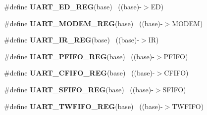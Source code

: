 \begin{DoxyCompactItemize}
\item 
\hypertarget{group___u_a_r_t___register___accessor___macros_ga57f93e1822a33516f473d1b62075115a}{}\#define {\bfseries U\+A\+R\+T\+\_\+\+E\+D\+\_\+\+R\+E\+G}(base)                                            ~((base)-\/$>$E\+D)\label{group___u_a_r_t___register___accessor___macros_ga57f93e1822a33516f473d1b62075115a}

\item 
\hypertarget{group___u_a_r_t___register___accessor___macros_ga7508e2348a7d075db40ace1902a407fa}{}\#define {\bfseries U\+A\+R\+T\+\_\+\+M\+O\+D\+E\+M\+\_\+\+R\+E\+G}(base)                                      ~((base)-\/$>$M\+O\+D\+E\+M)\label{group___u_a_r_t___register___accessor___macros_ga7508e2348a7d075db40ace1902a407fa}

\item 
\hypertarget{group___u_a_r_t___register___accessor___macros_gae4a662d77f88c67afe8fe2c1d5e2fa81}{}\#define {\bfseries U\+A\+R\+T\+\_\+\+I\+R\+\_\+\+R\+E\+G}(base)                                            ~((base)-\/$>$I\+R)\label{group___u_a_r_t___register___accessor___macros_gae4a662d77f88c67afe8fe2c1d5e2fa81}

\item 
\hypertarget{group___u_a_r_t___register___accessor___macros_ga7cb53756bda6ba3cb137ecf5ac5f13ae}{}\#define {\bfseries U\+A\+R\+T\+\_\+\+P\+F\+I\+F\+O\+\_\+\+R\+E\+G}(base)                                      ~((base)-\/$>$P\+F\+I\+F\+O)\label{group___u_a_r_t___register___accessor___macros_ga7cb53756bda6ba3cb137ecf5ac5f13ae}

\item 
\hypertarget{group___u_a_r_t___register___accessor___macros_gaabc1c7c6bba8bb960193478fa697fe15}{}\#define {\bfseries U\+A\+R\+T\+\_\+\+C\+F\+I\+F\+O\+\_\+\+R\+E\+G}(base)                                      ~((base)-\/$>$C\+F\+I\+F\+O)\label{group___u_a_r_t___register___accessor___macros_gaabc1c7c6bba8bb960193478fa697fe15}

\item 
\hypertarget{group___u_a_r_t___register___accessor___macros_ga6cb39496b0199428a152fa8a68ec6a56}{}\#define {\bfseries U\+A\+R\+T\+\_\+\+S\+F\+I\+F\+O\+\_\+\+R\+E\+G}(base)                                      ~((base)-\/$>$S\+F\+I\+F\+O)\label{group___u_a_r_t___register___accessor___macros_ga6cb39496b0199428a152fa8a68ec6a56}

\item 
\hypertarget{group___u_a_r_t___register___accessor___macros_ga6204d5850da243402d242d414cdb66f0}{}\#define {\bfseries U\+A\+R\+T\+\_\+\+T\+W\+F\+I\+F\+O\+\_\+\+R\+E\+G}(base)                                    ~((base)-\/$>$T\+W\+F\+I\+F\+O)\label{group___u_a_r_t___register___accessor___macros_ga6204d5850da243402d242d414cdb66f0}


\end{DoxyCompactItemize}
